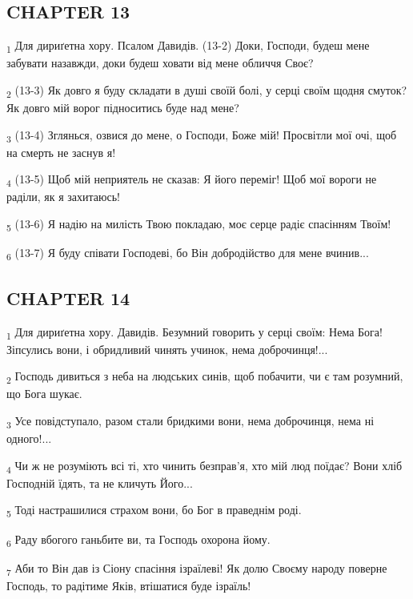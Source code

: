 \subsection{CHAPTER 13}
\begin{tcolorbox}
\textsubscript{1} Для дириґетна хору. Псалом Давидів. (13-2) Доки, Господи, будеш мене забувати назавжди, доки будеш ховати від мене обличчя Своє?
\end{tcolorbox}
\begin{tcolorbox}
\textsubscript{2} (13-3) Як довго я буду складати в душі своїй болі, у серці своїм щодня смуток? Як довго мій ворог підноситись буде над мене?
\end{tcolorbox}
\begin{tcolorbox}
\textsubscript{3} (13-4) Зглянься, озвися до мене, о Господи, Боже мій! Просвітли мої очі, щоб на смерть не заснув я!
\end{tcolorbox}
\begin{tcolorbox}
\textsubscript{4} (13-5) Щоб мій неприятель не сказав: Я його переміг! Щоб мої вороги не раділи, як я захитаюсь!
\end{tcolorbox}
\begin{tcolorbox}
\textsubscript{5} (13-6) Я надію на милість Твою покладаю, моє серце радіє спасінням Твоїм!
\end{tcolorbox}
\begin{tcolorbox}
\textsubscript{6} (13-7) Я буду співати Господеві, бо Він добродійство для мене вчинив...
\end{tcolorbox}
\subsection{CHAPTER 14}
\begin{tcolorbox}
\textsubscript{1} Для дириґетна хору. Давидів. Безумний говорить у серці своїм: Нема Бога! Зіпсулись вони, і обридливий чинять учинок, нема доброчинця!...
\end{tcolorbox}
\begin{tcolorbox}
\textsubscript{2} Господь дивиться з неба на людських синів, щоб побачити, чи є там розумний, що Бога шукає.
\end{tcolorbox}
\begin{tcolorbox}
\textsubscript{3} Усе повідступало, разом стали бридкими вони, нема доброчинця, нема ні одного!...
\end{tcolorbox}
\begin{tcolorbox}
\textsubscript{4} Чи ж не розуміють всі ті, хто чинить безправ'я, хто мій люд поїдає? Вони хліб Господній їдять, та не кличуть Його...
\end{tcolorbox}
\begin{tcolorbox}
\textsubscript{5} Тоді настрашилися страхом вони, бо Бог в праведнім роді.
\end{tcolorbox}
\begin{tcolorbox}
\textsubscript{6} Раду вбогого ганьбите ви, та Господь охорона йому.
\end{tcolorbox}
\begin{tcolorbox}
\textsubscript{7} Аби то Він дав із Сіону спасіння ізраїлеві! Як долю Своєму народу поверне Господь, то радітиме Яків, втішатися буде ізраїль!
\end{tcolorbox}
